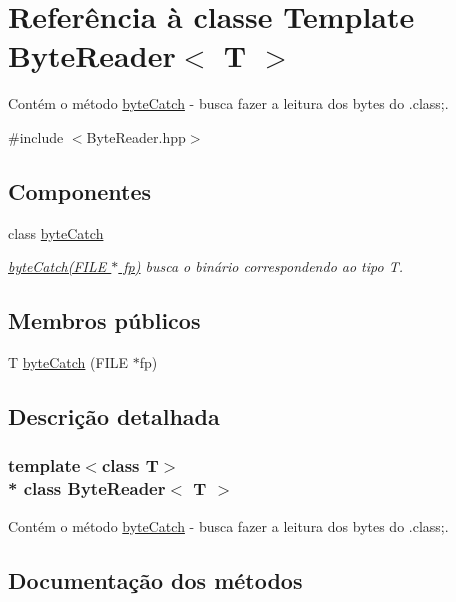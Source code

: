 \hypertarget{class_byte_reader}{}\section{Referência à classe Template Byte\+Reader$<$ T $>$}
\label{class_byte_reader}


Contém o método \hyperlink{class_byte_reader_1_1byte_catch}{byte\+Catch} -\/ busca fazer a leitura dos bytes do .class;.  




{\ttfamily \#include $<$Byte\+Reader.\+hpp$>$}

\subsection*{Componentes}
\begin{DoxyCompactItemize}
\item 
class \hyperlink{class_byte_reader_1_1byte_catch}{byte\+Catch}
\begin{DoxyCompactList}\small\item\em \hyperlink{class_byte_reader_ae570748805994596f51ae033183935d7}{byte\+Catch(\+F\+I\+L\+E $\ast$ fp)} busca o binário correspondendo ao tipo T. \end{DoxyCompactList}\end{DoxyCompactItemize}
\subsection*{Membros públicos}
\begin{DoxyCompactItemize}
\item 
T \hyperlink{class_byte_reader_ae570748805994596f51ae033183935d7}{byte\+Catch} (F\+I\+LE $\ast$fp)
\end{DoxyCompactItemize}


\subsection{Descrição detalhada}
\subsubsection*{template$<$class T$>$\\*
class Byte\+Reader$<$ T $>$}

Contém o método \hyperlink{class_byte_reader_1_1byte_catch}{byte\+Catch} -\/ busca fazer a leitura dos bytes do .class;. 

\subsection{Documentação dos métodos}
